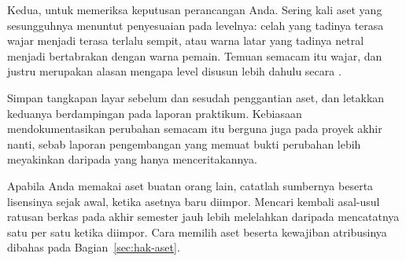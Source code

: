 Kedua, untuk memeriksa keputusan perancangan Anda. Sering kali aset yang
sesungguhnya menuntut penyesuaian pada levelnya: celah yang tadinya terasa
wajar menjadi terasa terlalu sempit, atau warna latar yang tadinya netral
menjadi bertabrakan dengan warna pemain. Temuan semacam itu wajar, dan justru
merupakan alasan mengapa level disusun lebih dahulu secara
.

\begin{tipsbox}
Simpan tangkapan layar sebelum dan sesudah penggantian aset, dan letakkan
keduanya berdampingan pada laporan praktikum. Kebiasaan mendokumentasikan
perubahan semacam itu berguna juga pada proyek akhir nanti, sebab laporan
pengembangan yang memuat bukti perubahan lebih meyakinkan daripada yang hanya
menceritakannya.
\end{tipsbox}

\begin{peringatanbox}
Apabila Anda memakai aset buatan orang lain, catatlah sumbernya beserta
lisensinya sejak awal, ketika asetnya baru diimpor. Mencari kembali asal-usul
ratusan berkas pada akhir semester jauh lebih melelahkan daripada mencatatnya
satu per satu ketika diimpor. Cara memilih aset beserta kewajiban atribusinya
dibahas pada Bagian~\ref{sec:hak-aset}.
\end{peringatanbox}
